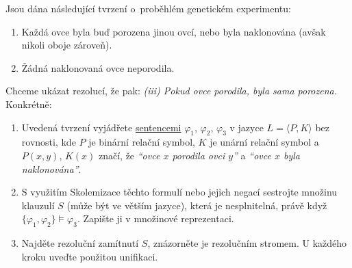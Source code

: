 \documentclass[a4paper,12pt]{article}
\begin{document}
\medskip\begin{problem}
Jsou dána následující tvrzení o~proběhlém genetickém experimentu:
\begin{enumerate}[label=(\roman*)]\it
    \item Každá ovce byla buď porozena jinou ovcí, nebo byla naklonována (avšak nikoli oboje zároveň).
    \item Žádná naklonovaná ovce neporodila.
\end{enumerate}
Chceme ukázat rezolucí, že pak: {\it (iii) Pokud ovce porodila, byla sama porozena.} Konkrétně:
\begin{enumerate}
    \item Uvedená tvrzení vyjádřete \underline{sentencemi} $\varphi_1$, $\varphi_2$, $\varphi_3$ v jazyce $L=\langle P,K\rangle$ bez rovnosti, kde $P$ je binární relační symbol, $K$ je unární relační symbol a $P(x,y)$, $K(x)$ značí, že \emph{``ovce $x$ porodila ovci $y$''} a \emph{``ovce $x$ byla naklonována''}.    
    \item S využitím Skolemizace těchto formulí nebo jejich negací sestrojte množinu klauzulí $S$ (může být ve větším jazyce), která je nesplnitelná, právě když  $\{\varphi_1, \varphi_2\} \models \varphi_3$. Zapište ji v množinové reprezentaci.
    \item Najděte rezoluční zamítnutí $S$, znázorněte je rezolučním stromem. U každého kroku uveďte použitou unifikaci.
\end{enumerate}
\end{problem}
        
\end{document}
